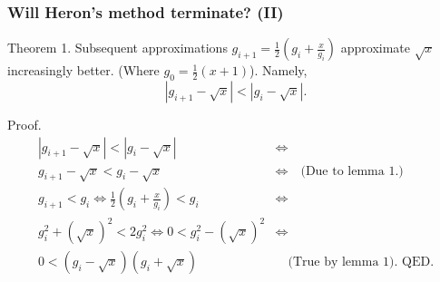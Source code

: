\documentclass{beamer} %
\newcommand\emc[1]{\textcolor{brightblue}{\textbf{#1}}}
\begin{document}
\begin{frame}
\frametitle{Will Heron's method terminate? (II)}

Theorem 1. Subsequent approximations $g_{i+1} = \frac{1}{2} (g_i + \frac{x}{g_i})$ approximate $\sqrt{x}$ increasingly better. (Where $g_0 = \frac{1}{2}(x + 1)$). Namely, 
\[|g_{i+1} - \sqrt{x}| < |g_{i} - \sqrt{x}|.\]


Proof.
\begin{align}
|g_{i+1} - \sqrt{x}| < |g_{i} - \sqrt{x}| &\Leftrightarrow \\
g_{i+1} - \sqrt{x} < g_{i} - \sqrt{x} &\Leftrightarrow \quad \text{(Due to lemma 1.)} \\
g_{i+1} < g_{i} \Leftrightarrow 
\frac{1}{2} (g_i + \frac{x}{g_i}) < g_{i} &\Leftrightarrow \\
g_i^2 + (\sqrt{x})^2 < 2g_i^2 \Leftrightarrow
0 < g_i^2 - (\sqrt{x})^2 &\Leftrightarrow \\
0 < (g_i - \sqrt{x})(g_i + \sqrt{x}) &\quad \text{(True by lemma 1). QED.}
\end{align}

\end{frame}


\end{document}
